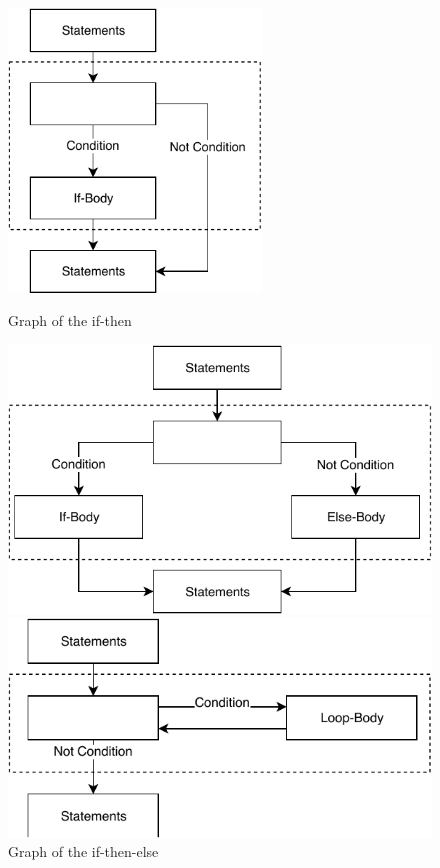 \begin{figure}[ht]
  \centering
  \begin{minipage}[h]{0.43\textwidth}
  	\centering
    \includegraphics[width=0.6\textwidth]{images/if}
    \caption{Graph of the if-then}
    \label{fig:cfg_if}
  \end{minipage}
  \begin{minipage}[h]{0.43\textwidth}
  	\centering
    \includegraphics[width=\textwidth]{images/if-else}
    \caption{Graph of the if-then-else}
    \label{fig:cfg_if-else}
  \end{minipage}
  \newline \newline \vfill
  \begin{minipage}[h]{0.43\textwidth}
  	\centering
    \includegraphics[width=\textwidth]{images/while}

\end{minipage}
\end{figure}
